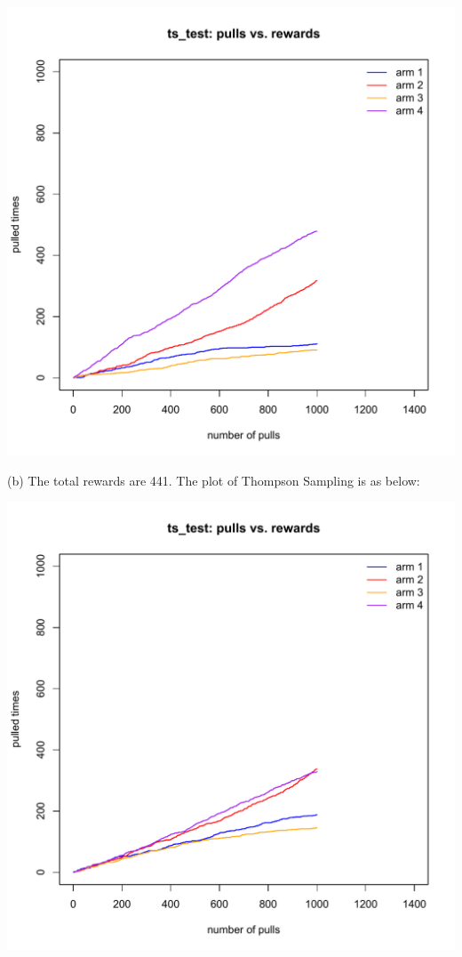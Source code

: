 \documentclass{article}
\begin{document}
\includegraphics[width=1.0\textwidth]{ts11.pdf} 
\par
\quad (b) The total rewards are 441. The plot of Thompson Sampling is as below: \par
\includegraphics[width=1.0\textwidth]{ts100.pdf} 
\end{document}
